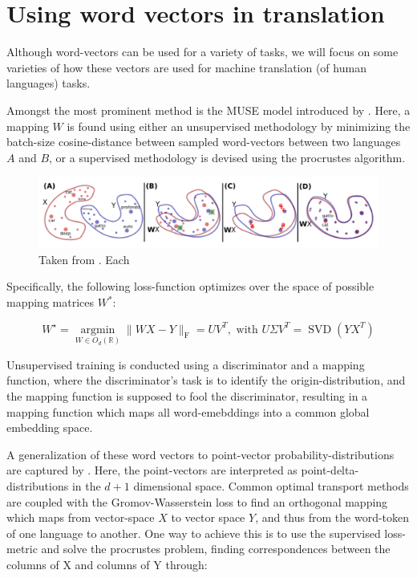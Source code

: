 \documentclass[a4paper,12pt,twoside,openright]{report}
\begin{document}
\chapter{Using word vectors in translation}\label{AppendixApplication}


Although word-vectors can be used for a variety of tasks, we will focus on some varieties of how these vectors are used for machine translation (of human languages) tasks.

Amongst the most prominent method is the MUSE model introduced by \cite{conneau17}.
Here, a mapping $W$ is found using either an unsupervised methodology by minimizing the batch-size cosine-distance between sampled word-vectors between two languages $A$ and $B$, or a supervised methodology is devised using the procrustes algorithm.

\begin{figure}[h]
	\center
  \includegraphics[width=\linewidth]{./assets/relatedwork/muse.png}
  \caption{Taken from \cite{conneau17}. Each }
  \label{fig:muse_translation}
\end{figure}

Specifically, the following loss-function optimizes over the space of possible mapping matrices $W^*$:

\begin{equation}
W^{\star}=\underset{W \in O_{d}(\mathbb{R})}{\operatorname{argmin}}\|W X-Y\|_{\mathrm{F}}=U V^{T}, \text { with } U \Sigma V^{T}=\operatorname{SVD}\left(Y X^{T}\right)
\end{equation}

Unsupervised training is conducted using a discriminator and a mapping function, where the discriminator's task is to identify the origin-distribution, and the mapping function is supposed to fool the discriminator, resulting in a mapping function which maps all word-emebddings into a common global embedding space.

A generalization of these word vectors to point-vector probability-distributions are captured by \cite{alvarez18}.
Here, the point-vectors are interpreted as point-delta-distributions in the $d+1$ dimensional space.
Common optimal transport methods are coupled with the Gromov-Wasserstein loss to find an orthogonal mapping which maps from vector-space $X$ to vector space $Y$, and thus from the word-token of one language to another.
One way to achieve this is to use the supervised loss-metric and solve the procrustes problem, finding correspondences between the columns of X and columns of Y through:
\end{document}
